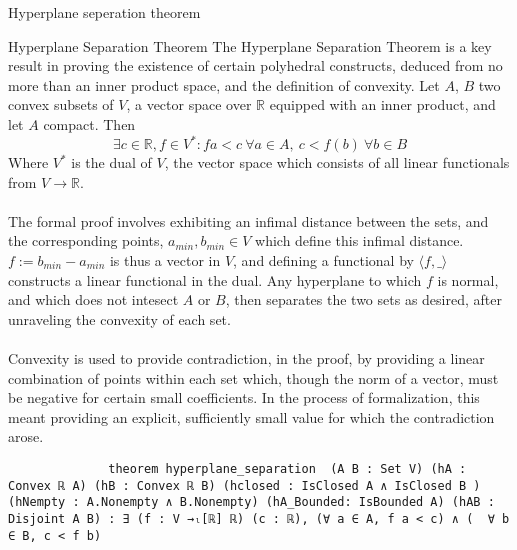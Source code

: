 \documentclass[final]{beamer}
\newlength{\colwidth}
\begin{document}
\begin{frame}[fragile]
\begin{columns}[t]
\begin{column}{\colwidth}
            \begin{block}{Hyperplane seperation theorem}
                            \begin{alertblock}{Hyperplane Separation Theorem}
              The Hyperplane Separation Theorem is a key result in proving the existence of certain polyhedral constructs, deduced from no more than an inner product space, and the
              definition of convexity. Let $A$, $B$ two convex subsets of $V$, a vector space over $\mathbb{R}$ equipped with an inner product, and let $A$ compact. Then \begin{equation}
                \exists c\in \mathbb{R}, f \in V^*: fa < c\ \forall a\in A, \ c < f(b)\ \forall b\in B
              \end{equation} Where $V^*$ is the dual of $V$, the vector space which consists of all linear functionals from $V\to \mathbb{R}$.
              \\\\The formal proof involves exhibiting an infimal distance between the sets, and the corresponding points, $a_{min}, b_{min} \in V$ which define this infimal distance.
              $f:= b_{min}-a_{min}$ is thus a vector in $V$, and defining a functional by $\langle f, \_\rangle$ constructs a linear functional in the dual. Any hyperplane to which $f$
              is normal, and which does not intesect $A$ or $B$, then separates the two sets as desired, after unraveling the convexity of each set.
              \\\\Convexity is used to provide contradiction, in the proof, by providing a linear combination of points within each set which, though the norm of a vector,
              must be negative for certain small coefficients. In the process of formalization, this meant providing an explicit, sufficiently small value for which the contradiction arose.

              \begin{verbatim}
              theorem hyperplane_separation  (A B : Set V) (hA : Convex ℝ A) (hB : Convex ℝ B) (hclosed : IsClosed A ∧ IsClosed B ) (hNempty : A.Nonempty ∧ B.Nonempty) (hA_Bounded: IsBounded A) (hAB : Disjoint A B) : ∃ (f : V →ₗ[ℝ] ℝ) (c : ℝ), (∀ a ∈ A, f a < c) ∧ (  ∀ b ∈ B, c < f b)
            \end{verbatim}
             
            \end{alertblock}

            
             

\end{block}
\end{column}
\end{columns}
\end{frame}
\end{document}
